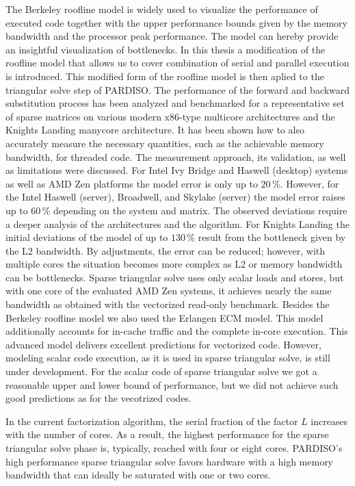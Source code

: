The Berkeley roofline model is widely used to visualize the performance of executed code together with the upper performance bounds given by the memory bandwidth and the processor peak performance. The model can hereby provide an insightful visualization of bottlenecks. In this thesis a modification of the roofline model that allows us to cover combination of serial and parallel execution is introduced. This modified form of the roofline model is then aplied to the triangular solve step of PARDISO. The performance of the forward and backward substitution process has been analyzed and benchmarked for a representative set of sparse matrices on various modern x86-type multicore architectures and the Knights Landing manycore architecture. It has been shown how to also accurately measure the necessary quantities, such as the achievable memory bandwidth, for threaded code. The measurement approach, its validation, as well as limitations were discussed.
For Intel Ivy Bridge and Haswell (desktop) systems as well as AMD Zen platforms the model error is only up to $20\,\%$. However, for the Intel Haswell (server), Broadwell, and Skylake (server) the model error raises up to $60\,\%$ depending on the system and matrix. The observed deviations require a deeper analysis
of the architectures and the algorithm. For Knights Landing the initial deviations of the model
of up to $130\,\%$ result from the bottleneck given by the L2 bandwidth.
By adjustments, the error can be reduced; however, with multiple cores the situation becomes more complex as L2 or memory bandwidth can be bottlenecks. Sparse triangular solve uses only scalar loads and stores, but with one core of the evaluated AMD Zen systems, it achieves nearly the same bandwidth as obtained with the vectorized read-only benchmark. Besides the Berkeley roofline model we also used the Erlangen ECM model. This model additionally accounts for in-cache traffic and the complete in-core execution. This advanced model delivers excellent predictions for vectorized code. However, modeling scalar code execution, as it is used in sparse triangular solve, is still under development. For the scalar code of sparse triangular solve we got a reasonable upper and lower bound of performance, but we did not achieve such good predictions as for the vecotrized codes.

In the current factorization algorithm, the serial fraction of the factor $L$
increases with the number of cores. As a result, the highest performance for the sparse triangular solve phase is, typically, reached with four or eight cores.
PARDISO's high performance sparse triangular solve favors hardware with a high
memory bandwidth that can ideally be saturated with one or two cores.
